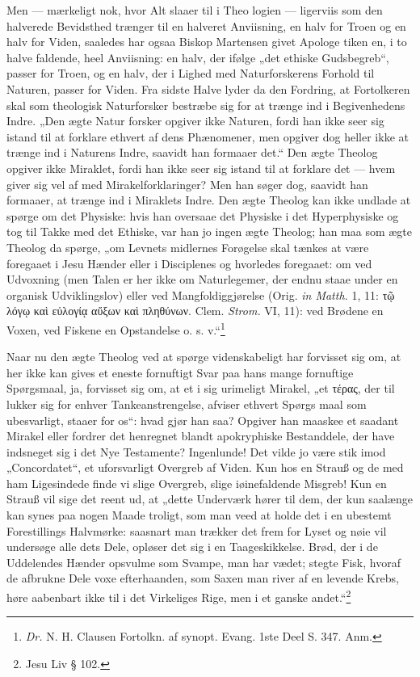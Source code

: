 \documentclass[12pt]{book}
\newcommand{\opage}[1]{\marginnote{\footnotesize\textit{[#1]}}}
\begin{document}
Men --- mærkeligt nok, hvor Alt slaaer til i Theo\-%
logien --- ligerviis som den halverede Bevidsthed trænger til
en halveret Anviisning, en halv for Troen og en halv for
Viden, saaledes har ogsaa Biskop Martensen givet Apologe\-%
tiken en, i to halve faldende, heel Anviisning: en halv, der
ifølge „det ethiske Gudsbegreb“, passer for Troen, og en halv,
der i Lighed med Naturforskerens Forhold til Naturen, passer
for Viden. Fra sidste Halve lyder da den Fordring, at
Fortolkeren skal som theologisk Naturforsker bestræbe sig for
at trænge ind i Begivenhedens Indre. „Den ægte Natur\-%
forsker opgiver ikke Naturen, fordi han ikke seer sig istand til at
forklare ethvert af dens Phænomener, men opgiver dog heller
ikke at trænge ind i Naturens Indre, saavidt han formaaer
det.“ Den ægte Theolog opgiver ikke Miraklet, fordi han
ikke seer sig istand til at forklare det --- hvem giver sig vel
af med Mirakelforklaringer? Men han søger dog, saavidt
han formaaer, at trænge ind i Miraklets Indre. Den ægte
Theolog kan ikke undlade at spørge om det Physiske: hvis
han oversaae det Physiske i det Hyperphysiske og tog til
Takke med det Ethiske, var han jo ingen ægte Theolog;
han maa som ægte Theolog da spørge, „om Levnets\-%
midlernes Forøgelse skal tænkes at være foregaaet i Jesu
Hænder eller i Disciplenes og hvorledes foregaaet: om ved
Udvoxning (men Talen er her ikke om Naturlegemer, der
endnu staae under en organisk Udviklingslov) eller ved
Mangfoldiggjørelse (Orig. \textit{in Matth.} 1, 11: τῷ λόγῳ
καὶ εὐλογίᾳ αὔξων καὶ πληθύνων. Clem. \textit{Strom.}
\opage{71}\setcounter{footnote}{0}%
VI, 11): ved Brødene en Voxen, ved Fiskene en Opstandelse
o. s. v.“\footnote{\textit{Dr.} N. H. Clausen Fortolkn. af synopt. Evang. 1ste Deel S.
347. Anm.%
}

Naar nu den ægte Theolog ved at spørge videnskabeligt
har forvisset sig om, at her ikke kan gives et eneste fornuftigt
Svar paa hans mange fornuftige Spørgsmaal, ja, forvisset
sig om, at et i sig urimeligt Mirakel, „et τέρας, der til\-%
lukker sig for enhver Tankeanstrengelse, afviser ethvert Spørgs\-%
maal som ubesvarligt, staaer for os“: hvad gjør han saa?
Opgiver han maaskee et saadant Mirakel eller fordrer det
henregnet blandt apokryphiske Bestanddele, der have indsneget
sig i det Nye Testamente? Ingenlunde! Det vilde jo være
stik imod „Concordatet“, et uforsvarligt Overgreb af Viden.
Kun hos en Strauß og de med ham Ligesindede finde vi slige
Overgreb, slige iøinefaldende Misgreb! Kun en Strauß vil sige
det reent ud, at „dette Underværk hører til dem, der kun
saalænge kan synes paa nogen Maade troligt, som man veed
at holde det i en ubestemt Forestillings Halvmørke: saasnart
man trækker det frem for Lyset og nøie vil undersøge alle
dets Dele, opløser det sig i en Taageskikkelse. Brød, der i
de Uddelendes Hænder opsvulme som Svampe, man har
vædet; stegte Fisk, hvoraf de afbrukne Dele voxe efterhaanden,
som Saxen man river af en levende Krebs, høre aabenbart
ikke til i det Virkeliges Rige, men i et ganske andet.“\footnote{Jesu Liv § 102.}
\end{document}
